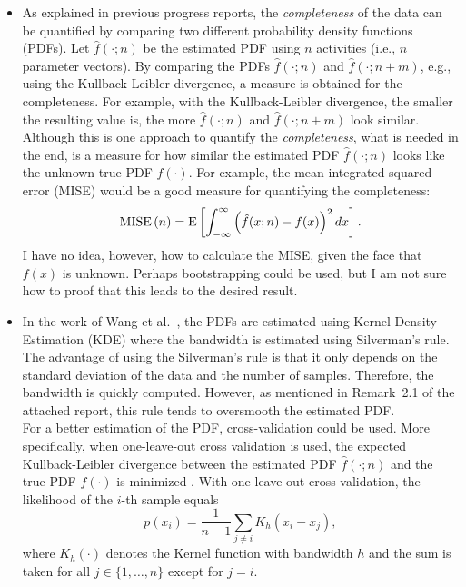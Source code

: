 \documentclass[10pt,final,a4paper,oneside,onecolumn]{article}
\newcommand{\expectation}[1]{\textup{E} \left[ #1 \right]}
\newcommand{\mise}[1]{\textup{MISE} \left( #1 \right)}
\begin{document}
\begin{itemize}
	\item As explained in previous progress reports, the \emph{completeness} of the data can be quantified by comparing two different probability density functions (PDFs). Let $\hat{f}(\cdot; n)$ be the estimated PDF using $n$ activities (i.e., $n$ parameter vectors). By comparing the PDFs $\hat{f}(\cdot; n)$ and $\hat{f}(\cdot; n+m)$, e.g., using the Kullback-Leibler divergence, a measure is obtained for the completeness. For example, with the Kullback-Leibler divergence, the smaller the resulting value is, the more $\hat{f}(\cdot;n)$ and $\hat{f}(\cdot;n+m)$ look similar. \\
	Although this is one approach to quantify the \emph{completeness}, what is needed in the end, is a measure for how similar the estimated PDF $\hat{f}(\cdot; n)$ looks like the unknown true PDF $f(\cdot)$. For example, the mean integrated squared error (MISE) \cite{turlach1993bandwidthselection} would be a good measure for quantifying the completeness:
	\begin{equation} \label{eq:mise}
		\mise{n} = \expectation{\int_{-\infty}^{\infty} \left( \hat{f}(x;n) - f(x) \right)^2 dx}.
	\end{equation}
	I have no idea, however, how to calculate the MISE, given the face that $f(x)$ is unknown. Perhaps bootstrapping \cite{efron1994bootstrap} could be used, but I am not sure how to proof that this leads to the desired result.
	
	\item In the work of Wang et al.\ \cite{wang2017much}, the PDFs are estimated using Kernel Density Estimation (KDE) where the bandwidth is estimated using Silverman's rule. The advantage of using the Silverman's rule is that it only depends on the standard deviation of the data and the number of samples. Therefore, the bandwidth is quickly computed. However, as mentioned in Remark~2.1 of the attached report, this rule tends to oversmooth the estimated PDF. \\
	For a better estimation of the PDF, cross-validation could be used. More specifically, when one-leave-out cross validation is used, the expected Kullback-Leibler divergence between the estimated PDF $\hat{f}(\cdot;n)$ and the true PDF $f(\cdot)$ is minimized \cite{turlach1993bandwidthselection}. With one-leave-out cross validation, the likelihood of the $i$-th sample equals
	\begin{equation} \label{eq:sample likelihood}
		p(x_i) = \frac{1}{n-1} \sum_{j \ne i} K_h(x_i - x_j),
	\end{equation}
	where $K_h(\cdot)$ denotes the Kernel function with bandwidth $h$ and the sum is taken for all $j\in \{1, \ldots, n\}$ except for $j=i$. 
	

\end{itemize}
\end{document}
